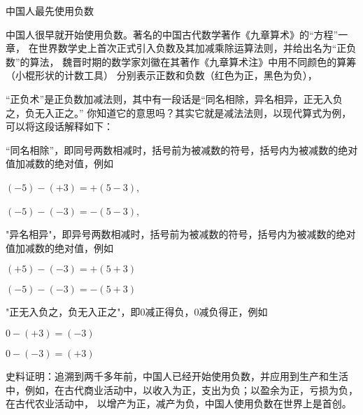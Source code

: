 \documentclass{article}
\begin{document}
\begin{article}

\begin{center}
    中国人最先使用负数
\end{center}

中国人很早就开始使用负数。著名的中国古代数学著作《九章算术》的“方程”一章，
在世界数学史上首次正式引入负数及其加减乘除运算法则，并给出名为“正负数”的算法，
魏晋时期的数学家刘徽在其著作《九章算术注》中用不同颜色的算筹（小棍形状的计数工具）
分别表示正数和负数（红色为正，黑色为负），

“正负术”是正负数加减法则，其中有一段话是“同名相除，异名相异，正无入负之，负无入正之。”
你知道它的意思吗？其实它就是减法法则，以现代算式为例，可以将这段话解释如下：

“同名相除”，即同号两数相减时，括号前为被减数的符号，括号内为被减数的绝对值加减数的绝对值，例如

${(-5)}-{(+3)}={+(5-3)}$,

${(-5)}-{(-3)}={-(5-3)}$,

"异名相异"，即异号两数相减时，括号前为被减数的符号，括号内为被减数的绝对值加减数的绝对值，例如

${(+5)}-{(-3)}={+(5+3)}$

${(-5)}-{(-3)}={-(5+3)}$

"正无入负之，负无入正之"，即0减正得负，0减负得正，例如

$0-{(+3)}={(-3)}$

$0-{(-3)}={(+3)}$

史料证明：追溯到两千多年前，中国人已经开始使用负数，并应用到生产和生活中，例如，在古代商业活动中，以收入为正，支出为负；以盈余为正，亏损为负，在古代农业活动中，
以增产为正，减产为负，中国人使用负数在世界上是首创。

\end{article}
\end{document}
